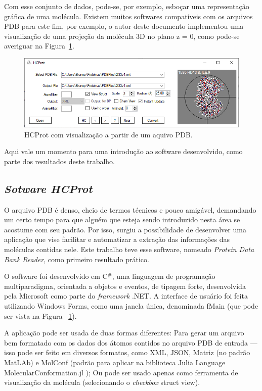 Com esse conjunto de dados, pode-se, por exemplo, esboçar uma representação gráfica de uma molécula. Existem muitos softwares compatíveis com os arquivos PDB para este fim, por exemplo, o autor deste documento implementou uma visualização de uma projeção da molécula 3D no plano z = 0, como pode-se averiguar na Figura~\ref{fig:molproj}.

\begin{figure}[H]
	\begin{center}
		\includegraphics[width=1\linewidth]{secProteins/figures/molproj.png}
	\end{center}
	\caption{HCProt com visualização a partir de um aquivo PDB.}
	\label{fig:molproj}
\end{figure}


Aqui vale um momento para uma introdução ao software desenvolvido, como parte dos resultados deste trabalho. 
\subsection*{\textit{Sotware HCProt}}
O arquivo PDB é denso, cheio de termos técnicos e pouco amigável, demandando um certo tempo para que alguém que esteja sendo introduzido nesta área se acostume com seu padrão. Por isso, surgiu a possibilidade de desenvolver uma aplicação que vise facilitar e automatizar a extração das informações das moléculas contidas nele. Este trabalho teve esse software, nomeado \textit{Protein Data Bank Reader}, como primeiro resultado prático.

O software foi desenvolvido em C${^\#}$, uma linguagem de programação multiparadigma, orientada a objetos e eventos, de tipagem forte, desenvolvida pela Microsoft como parte do \textit{framework }.NET. A interface de usuário foi feita utilizando Windows Forms, como uma janela única, denominada fMain (que pode ser vista na Figura ~\ref{fig:molproj}).

A aplicação pode ser usada de duas formas diferentes: Para gerar um arquivo bem formatado com os dados dos átomos contidos no arquivo PDB de entrada --- isso pode ser feito em diversos formatos, como XML, JSON, Matriz (no padrão MatLAb) e MolConf (padrão para aplicar na biblioteca Julia Language MolecularConformation.jl \cite{emersonMolConf}); Ou pode ser usado apenas como ferramenta de visualização da molécula (selecionando o \textit{checkbox} struct view).

